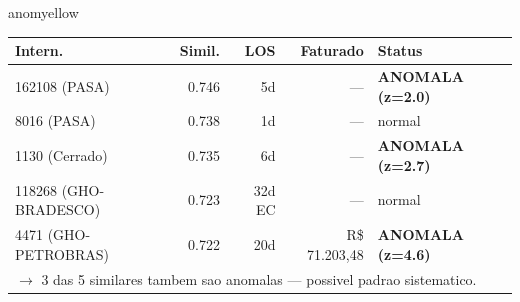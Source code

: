 \documentclass[a4paper,10pt]{article}
\begin{document}
\begin{anomalycard}[Internacao 115983 | GHO-BRADESCO | MODERADO (z=2.26)]{anomyellow}
\begin{tabular}{l r r r l}\toprule\textbf{Intern.} & \textbf{Simil.} & \textbf{LOS} & \textbf{Faturado} & \textbf{Status} \\\midrule
162108 (PASA) & 0.746 & 5d & --- & \textcolor{anomred}{\textbf{ANOMALA (z=2.0)}} \\
8016 (PASA) & 0.738 & 1d & --- & \textcolor{jcubeblue}{normal} \\
1130 (Cerrado) & 0.735 & 6d & --- & \textcolor{anomred}{\textbf{ANOMALA (z=2.7)}} \\
118268 (GHO-BRADESCO) & 0.723 & 32d EC & --- & \textcolor{jcubeblue}{normal} \\
4471 (GHO-PETROBRAS) & 0.722 & 20d & R\$ 71.203,48 & \textcolor{anomred}{\textbf{ANOMALA (z=4.6)}} \\
\multicolumn{5}{l}{\textcolor{anomred}{\small $\rightarrow$ 3 das 5 similares tambem sao anomalas --- possivel padrao sistematico.}} \\
\bottomrule\end{tabular}


\end{anomalycard}

\newpage
\end{document}
